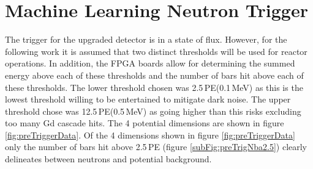 \clearpage
\section{Machine Learning Neutron Trigger}\label{sec:MachineLearningTrigger}
The trigger for the upgraded detector is in a state of flux. However, for the following work it is assumed that two distinct thresholds will be used for reactor operations. In addition, the FPGA boards allow for determining the summed energy above each of these thresholds and the number of bars hit above each of these thresholds. The lower threshold chosen was 2.5\,PE(0.1\,MeV) as this is the lowest threshold willing to be entertained to mitigate dark noise. The upper threshold chose was 12.5\,PE(0.5\,MeV) as going higher than this risks excluding too many Gd cascade hits. The 4 potential dimensions are shown in figure \ref{fig:preTriggerData}. Of the 4 dimensions shown in figure \ref{fig:preTriggerData} only the number of bars hit above 2.5\,PE (figure \ref{subFig:preTrigNba2.5}) clearly delineates between neutrons and potential background.  
